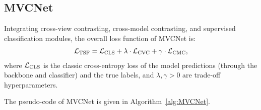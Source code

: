 \documentclass[journal]{IEEEtran}
\begin{document}
\subsection{MVCNet}
Integrating cross-view contrasting, cross-model contrasting, and supervised classification modules, the overall loss function of MVCNet is:
\begin{align}
\mathcal{L}_\textmd{TSF} = \mathcal{L}_\textmd{CLS} + \lambda \cdot \mathcal{L}_\textmd{CVC} + \gamma \cdot \mathcal{L}_\textmd{CMC},\label{eq:TSF_loss}
\end{align}
where $\mathcal{L}_\textmd{CLS}$ is the classic cross-entropy loss of the model predictions (through the backbone and classifier) and the true labels, and $\lambda, \gamma > 0$ are trade-off hyperparameters.

The pseudo-code of MVCNet is given in Algorithm~\ref{alg:MVCNet}.
\end{document}
